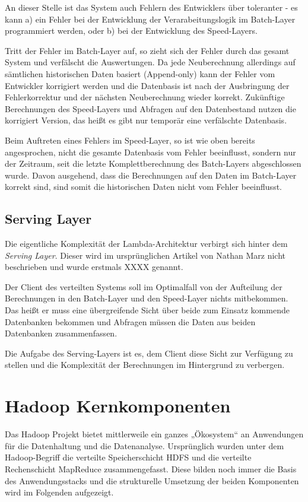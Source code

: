 \documentclass[a4paper,11pt]{scrartcl}
\begin{document}
An dieser Stelle ist das System auch Fehlern des Entwicklers über toleranter -
es kann a) ein Fehler bei der Entwicklung der Verarabeitungslogik im
Batch-Layer programmiert werden, oder b) bei der Entwicklung des Speed-Layers.

Tritt der Fehler im Batch-Layer auf, so zieht sich der Fehler durch das gesamt
System und verfälscht die Auswertungen. Da jede Neuberechnung allerdings auf
sämtlichen historischen Daten basiert (Append-only) kann der Fehler vom
Entwickler korrigiert werden und die Datenbasis ist nach der Ausbringung der
Fehlerkorrektur und der nächsten Neuberechnung wieder korrekt. Zukünftige
Berechnungen des Speed-Layers und Abfragen auf den Datenbestand nutzen die
korrigiert Version, das heißt es gibt nur temporär eine verfälschte Datenbasis.

Beim Auftreten eines Fehlers im Speed-Layer, so ist wie oben bereits
angesprochen, nicht die gesamte Datenbasis vom Fehler beeinflusst, sondern nur
der Zeitraum, seit die letzte Komplettberechnung des Batch-Layers abgeschlossen
wurde. Davon ausgehend, dass die Berechnungen auf den Daten im Batch-Layer
korrekt sind, sind somit die historischen Daten nicht vom Fehler beeinflusst.

\subsection{Serving Layer}
Die eigentliche Komplexität der Lambda-Architektur verbirgt sich hinter dem
\textit{Serving Layer}. Dieser wird im ursprünglichen Artikel von Nathan Marz
nicht beschrieben und wurde erstmals XXXX genannt. 

Der Client des verteilten Systems soll im Optimalfall von der Aufteilung der
Berechnungen in den Batch-Layer und den Speed-Layer nichts mitbekommen. Das
heißt er muss eine übergreifende Sicht über beide zum Einsatz kommende
Datenbanken bekommen und Abfragen müssen die Daten aus beiden Datenbanken
zusammenfassen.

Die Aufgabe des Serving-Layers ist es, dem Client diese Sicht zur Verfügung zu
stellen und die Komplexität der Berechnungen im Hintergrund zu verbergen.

\section{Hadoop Kernkomponenten}
Das Hadoop Projekt bietet mittlerweile ein ganzes „Ökosystem“ an Anwendungen
für die Datenhaltung und die Datenanalyse. Ursprünglich wurden unter dem
Hadoop-Begriff die verteilte Speicherschicht HDFS und die verteilte
Rechenschicht MapReduce zusammengefasst. Diese bilden noch immer die Basis des
Anwendungsstacks und die strukturelle Umsetzung der beiden Komponenten wird im
Folgenden aufgezeigt.
\end{document}
